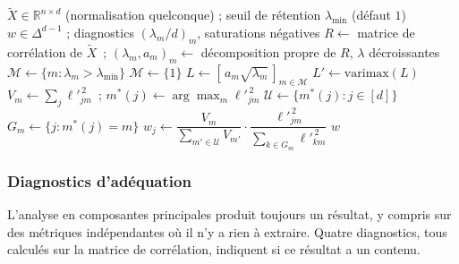 \documentclass[11pt,a4paper]{article}
\theoremstyle{definition}
\theoremstyle{remark}
\newcommand{\R}{\mathbb{R}}
\newcommand{\abs}[1]{\left\lvert #1 \right\rvert}
\newcommand{\simplex}{\Delta^{d-1}}
\begin{document}
\bigskip

\begin{algorithm}[htbp]
  \caption{Pondération OCDE--JRC}
  \label{algo:oecd}
  \begin{algorithmic}[1]
    \Require $\tilde{X} \in \R^{n \times d}$ (normalisation quelconque) ; seuil de
      rétention $\lambda_{\min}$ (défaut $1$)
    \Ensure $w \in \simplex$ ; diagnostics $(\lambda_m/d)_m$, saturations négatives
    \State $R \gets$ matrice de corrélation de $\tilde{X}$~;\quad
      $(\lambda_m, a_m)_m \gets$ décomposition propre de $R$, $\lambda$ décroissantes
    \State $\mathcal{M} \gets \{m : \lambda_m > \lambda_{\min}\}$
      \State $\mathcal{M} \gets \{1\}$ 
    \EndIf
    \State $L \gets [\,a_m \sqrt{\lambda_m}\,]_{m \in \mathcal{M}}$
      \Comment{Saturations, $(d, \abs{\mathcal{M}})$}
    \State $L' \gets \mathrm{varimax}(L)$
    \State $V_m \gets \sum_j \ell'^{\,2}_{jm}$~;\quad
      $m^*(j) \gets \arg\max_m \ell'^{\,2}_{jm}$
    \State $\mathcal{U} \gets \{m^*(j) : j \in [d]\}$
      \State $G_m \gets \{j : m^*(j) = m\}$
        \State $w_j \gets \dfrac{V_m}{\sum_{m' \in \mathcal{U}} V_{m'}} \cdot
          \dfrac{\ell'^{\,2}_{jm}}{\sum_{k \in G_m} \ell'^{\,2}_{km}}$
      \EndFor
    \EndFor
    \State \Return $w$ 
  \end{algorithmic}
\end{algorithm}

\bigskip

\subsubsection{Diagnostics d'adéquation}
\label{sec:acp-diagnostics}

\medskip

L'analyse en composantes principales produit toujours un résultat, y compris sur des
métriques indépendantes où il n'y a rien à extraire. Quatre diagnostics, tous calculés
sur la matrice de corrélation, indiquent si ce résultat a un contenu.

\medskip
\end{document}
